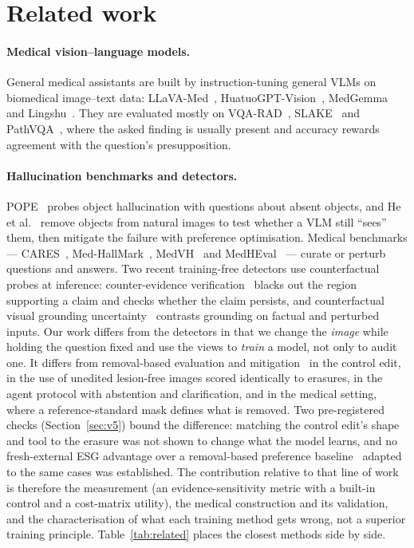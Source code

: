\documentclass[11pt]{article}
\begin{document}
\section{Related work}

\paragraph{Medical vision--language models.} General medical assistants are built by instruction-tuning general VLMs on biomedical image--text data: LLaVA-Med~\cite{llavamed}, HuatuoGPT-Vision~\cite{huatuo}, MedGemma~\cite{medgemma,medgemma15} and Lingshu~\cite{lingshu}. They are evaluated mostly on VQA-RAD~\cite{vqarad}, SLAKE~\cite{slake} and PathVQA~\cite{pathvqa}, where the asked finding is usually present and accuracy rewards agreement with the question's presupposition.

\paragraph{Hallucination benchmarks and detectors.} POPE~\cite{pope} probes object hallucination with questions about absent objects, and He et al.~\cite{removed} remove objects from natural images to test whether a VLM still ``sees'' them, then mitigate the failure with preference optimisation. Medical benchmarks --- CARES~\cite{cares}, Med-HallMark~\cite{medhallmark}, MedVH~\cite{medvh} and MedHEval~\cite{medheval} --- curate or perturb questions and answers. Two recent training-free detectors use counterfactual probes at inference: counter-evidence verification~\cite{coev} blacks out the region supporting a claim and checks whether the claim persists, and counterfactual visual grounding uncertainty~\cite{cvgu} contrasts grounding on factual and perturbed inputs. Our work differs from the detectors in that we change the \emph{image} while holding the question fixed and use the views to \emph{train} a model, not only to audit one. It differs from removal-based evaluation and mitigation~\cite{removed} in the control edit, in the use of unedited lesion-free images scored identically to erasures, in the agent protocol with abstention and clarification, and in the medical setting, where a reference-standard mask defines what is removed. Two pre-registered checks (Section~\ref{sec:v5}) bound the difference: matching the control edit's shape and tool to the erasure was not shown to change what the model learns, and no fresh-external ESG advantage over a removal-based preference baseline~\cite{removed} adapted to the same cases was established. The contribution relative to that line of work is therefore the measurement (an evidence-sensitivity metric with a built-in control and a cost-matrix utility), the medical construction and its validation, and the characterisation of what each training method gets wrong, not a superior training principle. Table~\ref{tab:related} places the closest methods side by side.
\end{document}
